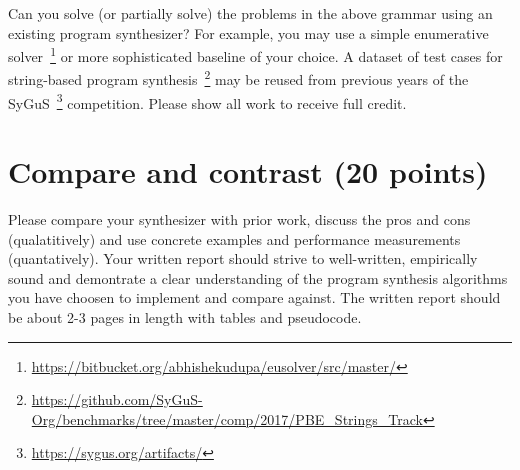 \documentclass[11pt]{article}
\begin{document}
    Can you solve (or partially solve) the problems in the above grammar using an existing program synthesizer? For example, you may use a simple enumerative solver~\footnote{\url{https://bitbucket.org/abhishekudupa/eusolver/src/master/}} or more sophisticated baseline of your choice. A dataset of test cases for string-based program synthesis~\footnote{\url{https://github.com/SyGuS-Org/benchmarks/tree/master/comp/2017/PBE_Strings_Track}} may be reused from previous years of the SyGuS~\footnote{\url{https://sygus.org/artifacts/}} competition. Please show all work to receive full credit.

    \section{Compare and contrast (20 points)}

    Please compare your synthesizer with prior work, discuss the pros and cons (qualatitively) and use concrete examples and performance measurements (quantatively). Your written report should strive to well-written, empirically sound and demontrate a clear understanding of the program synthesis algorithms you have choosen to implement and compare against. The written report should be about 2-3 pages in length with tables and pseudocode.
\end{document}
